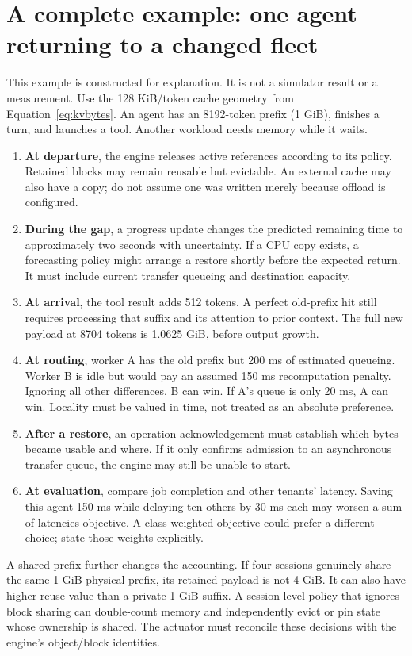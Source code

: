 \section{A complete example: one agent returning to a changed fleet}
This example is constructed for explanation. It is not a simulator result or a
measurement. Use the 128 KiB/token cache geometry from
Equation~\ref{eq:kvbytes}. An agent has an 8192-token prefix (1 GiB), finishes a
turn, and launches a tool. Another workload needs memory while it waits.

\begin{enumerate}
\item \textbf{At departure}, the engine releases active references according to
its policy. Retained blocks may remain reusable but evictable. An external cache
may also have a copy; do not assume one was written merely because offload is
configured.
\item \textbf{During the gap}, a progress update changes the predicted remaining
time to approximately two seconds with uncertainty. If a CPU copy exists, a
forecasting policy might arrange a restore shortly before the expected return.
It must include current transfer queueing and destination capacity.
\item \textbf{At arrival}, the tool result adds 512 tokens. A perfect old-prefix
hit still requires processing that suffix and its attention to prior context.
The full new payload at 8704 tokens is 1.0625 GiB, before output growth.
\item \textbf{At routing}, worker A has the old prefix but 200 ms of estimated
queueing. Worker B is idle but would pay an assumed 150 ms recomputation penalty.
Ignoring all other differences, B can win. If A's queue is only 20 ms, A can win.
Locality must be valued in time, not treated as an absolute preference.
\item \textbf{After a restore}, an operation acknowledgement must establish which
bytes became usable and where. If it only confirms admission to an asynchronous
transfer queue, the engine may still be unable to start.
\item \textbf{At evaluation}, compare job completion and other tenants' latency.
Saving this agent 150 ms while delaying ten others by 30 ms each may worsen a
sum-of-latencies objective. A class-weighted objective could prefer a different
choice; state those weights explicitly.
\end{enumerate}

A shared prefix further changes the accounting. If four sessions genuinely
share the same 1 GiB physical prefix, its retained payload is not 4 GiB. It can
also have higher reuse value than a private 1 GiB suffix. A session-level policy
that ignores block sharing can double-count memory and independently evict or
pin state whose ownership is shared. The actuator must reconcile these decisions
with the engine's object/block identities.

